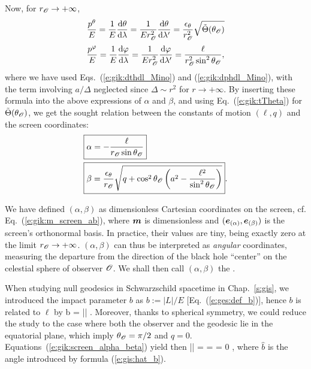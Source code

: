 Now, for $r_{\mathscr{O}}\to +\infty$,
\[
   \frac{p^\theta}{E} = \frac{1}{E} \frac{\mathrm{d} \theta}{\mathrm{d} \lambda} = \frac{1}{E r_{\mathscr{O}}^2}  \frac{\mathrm{d} \theta}{\mathrm{d} \lambda'} =
    \frac{\epsilon_\theta}{r_{\mathscr{O}}^2} \sqrt{\tilde\Theta(\theta_{\mathscr{O}})}
\]
\[
 \frac{p^\varphi}{E} = \frac{1}{E} \frac{\mathrm{d} \varphi}{\mathrm{d} \lambda} = \frac{1}{E r_{\mathscr{O}}^2}  \frac{\mathrm{d} \varphi}{\mathrm{d} \lambda'}
 = \frac{\ell}{r_{\mathscr{O}}^2 \sin^2\theta_{\mathscr{O}}} ,
\]
where we have used Eqs.~(\ref{e:gik:dthdl_Mino}) and (\ref{e:gik:dphdl_Mino}), with the
term involving $a/\Delta$ neglected since $\Delta \sim r^2$ for $r\to +\infty$.
By inserting these formula into the above expressions of $\alpha$ and $\beta$,
and using Eq.~(\ref{e:gik:tTheta}) for $\tilde\Theta(\theta_{\mathscr{O}})$,
we get the sought relation between the constants of motion $(\ell, q)$ and
the screen coordinates:
\begin{subequations}
\label{e:gik:screen_alpha_beta}
\begin{align}
& \fbox{$\displaystyle  \alpha = - \frac{\ell}{r_{\mathscr{O}}\sin\theta_{\mathscr{O}}} $} \\
& \fbox{$\displaystyle  \beta = \frac{\epsilon_\theta}{r_{\mathscr{O}}} \sqrt{ q + \cos^2\theta_{\mathscr{O}} \left( a^2
    - \frac{\ell^2}{\sin^2\theta_{\mathscr{O}}} \right) } $} .
\end{align}
\end{subequations}

We have defined $(\alpha,\beta)$ as dimensionless Cartesian coordinates on
the screen, cf. Eq.~(\ref{e:gik:m_screen_ab}), where $\bm{m}$ is
dimensionless and $(\bm{e}_{(\alpha)}, \bm{e}_{(\beta)})$
is the screen's orthonormal basis. In practice, their values are tiny,
being exactly zero at the limit $r_{\mathscr{O}}\to +\infty$. $(\alpha,\beta)$ can thus be interpreted as
\emph{angular} coordinates, measuring the departure from the direction
of the black hole ``center'' on the celestial sphere of observer $\mathscr{O}$.
We shall then call $(\alpha,\beta)$ the
.

\begin{remark}
When studying null geodesics in Schwarzschild spacetime in Chap.~\ref{s:gis}, we
introduced the impact parameter $b$ as $b := |L|/E$ [Eq.~(\ref{e:ges:def_b})], hence
$b$ is related to $\ell$ by
\be
    b = |\ell| .
\ee
Moreover, thanks to spherical symmetry, we could reduce the study to the case
where both the observer
and the geodesic lie in the equatorial plane, which imply $\theta_{\mathscr{O}} = \pi/2$
and $q=0$. Equations~(\ref{e:gik:screen_alpha_beta}) yield then
\be
    |\alpha| =  =  \qand \beta = 0 ,
\ee
where $\hat{b}$ is the angle introduced by formula (\ref{e:gis:hat_b}).
\end{remark}

